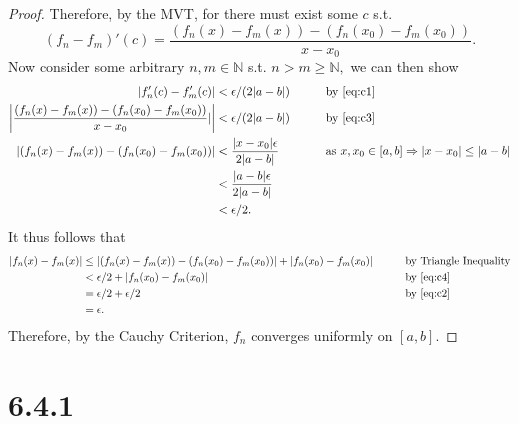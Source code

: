 \documentclass[10pt]{article}
\begin{document}
\begin{proof}
    Therefore, by the MVT, for there must exist some $c$ s.t.
    \begin{equation} \label{eq:c3}
        (f_n-f_m)'(c) = \frac{(f_n(x)-f_m(x))-(f_n(x_0)-f_m(x_0))}{x-x_0}.
    \end{equation}
    Now consider some arbitrary $n,m\in\mathbb{N}$ s.t. $n>m\ge \mathbb{N},$ we can then show
    \begin{alignat}{2}
        |f'_n(c)-f'_m(c)|&<\epsilon/(2|a-b|) \qquad&&\text{by \eqref{eq:c1}}\nonumber\\
        \left  |\frac{(f_n(x)-f_m(x))-(f_n(x_0)-f_m(x_0))}{x-x_0} | \right |&<\epsilon/(2|a-b|) &&\text{by \eqref{eq:c3}}\nonumber\\
        \left | (f_n(x)-f_m(x))-(f_n(x_0)-f_m(x_0))\right | &< \frac{|x-x_0|\epsilon}{2|a-b|} &&\text{as $x,x_0\in[a,b]\Rightarrow |x-x_0|\le|a-b|$}\nonumber\\
        &< \frac{|a-b|\epsilon}{2|a-b|} \nonumber\\
        &<\epsilon/2. \label{eq:c4}
    \end{alignat}
    It thus follows that
    \begin{alignat*}{2}
        |f_n(x)-f_m(x)|&\le |(f_n(x)-f_m(x))-(f_n(x_0)-f_m(x_0))| + |f_n(x_0)-f_m(x_0)| \qquad&&\text{by Triangle Inequality}\\
        &< \epsilon/2 + |f_n(x_0)-f_m(x_0)| &&\text{by \eqref{eq:c4}}\\
        &= \epsilon/2 + \epsilon/2 &&\text{by \eqref{eq:c2}}\\
        &= \epsilon.
    \end{alignat*}
    Therefore, by the Cauchy Criterion, $f_n$ converges uniformly on $[a,b].$ 


\end{proof}

\section*{6.4.1}
\end{document}
